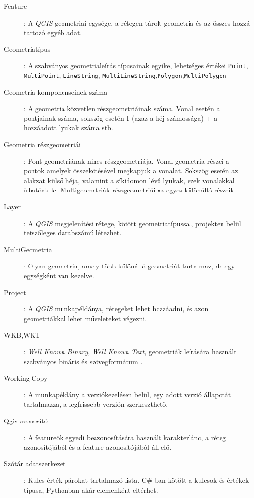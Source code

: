 \begin{description}
	\item[Feature]: A \emph{QGIS} geometriai egysége, a rétegen tárolt geometria és az összes hozzá tartozó egyéb adat.

	\item[Geometriatípus]: A szabványos geometrialeírás típusainak egyike, lehetséges értékei \texttt{Point}, \texttt{MultiPoint}, \texttt{LineString}, \texttt{MultiLineString},\texttt{Polygon},\texttt{MultiPolygon} 

	\item[Geometria komponenseinek száma]: A geometria közvetlen részgeometriáinak száma. Vonal esetén a pontjainak száma, sokszög esetén 1 (azaz a héj számossága) + a hozzáadott lyukak száma stb.

	\item[Geometria részgeometriái]: Pont geometriának nincs részgeometriája. Vonal geometria részei a pontok amelyek összekötésével megkapjuk a vonalat. Sokszög esetén az alakzat külső héja, valamint a síkidomon lévő lyukak, ezek vonalakkal írhatóak le. Multigeometriák részgeometriái az egyes különálló részeik.

	\item[Layer]: A \emph{QGIS} megjelenítési rétege, kötött geometriatípussal, projekten belül tetszőleges darabszámú létezhet.

	\item[MultiGeometria]: Olyan geometria, amely több különálló geometriát tartalmaz, de egy egységként van kezelve.

	\item[Project]: A \emph{QGIS} munkapéldánya, rétegeket lehet hozzáadni, és azon geometriákkal lehet műveleteket végezni.

	\item[WKB,WKT]: \emph{Well Known Binary}, \emph{Well Known Text}, geometriák leírására használt szabványos bináris és szövegformátum \cite{sfa}.

	\item[Working Copy]: A munkapéldány a verziókezelésen belül, egy adott verzió állapotát tartalmazza, a legfrissebb verzión szerkeszthető.

	\item[Qgis azonosító]: A featureök egyedi beazonosítására használt karakterlánc, a réteg azonosítójából és a feature azonosítójából áll elő.

	\item[Szótár adatszerkezet]: Kulcs-érték párokat tartalmazó lista. C\#-ban kötött a kulcsok és értékek típusa, Pythonban akár elemenként eltérhet.
\end{description}